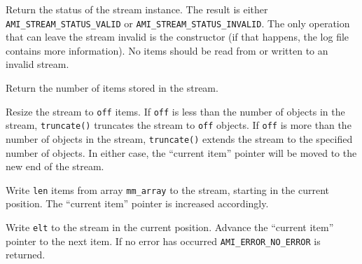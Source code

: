 \etabb


  
 \clearpage

  \btabb
     {Return the status
    of the stream instance. The result is either
    \lstinline|AMI_STREAM_STATUS_VALID| or
    \lstinline|AMI_STREAM_STATUS_INVALID|. The only operation that can
    leave the stream invalid is the constructor (if that happens, the log
    file contains more information). No items should be read from or
    written to an invalid stream.}
  
    {Return the number of items stored in
    the stream.}  
    
      {Resize the stream to
      \lstinline|off| items. If \lstinline|off| is less than the
      number of objects in the stream, \lstinline|truncate()|
      truncates the stream to \lstinline|off| objects. If
      \lstinline|off| is more than the number of objects in the
      stream, \lstinline|truncate()| extends the stream to the
      specified number of objects. In either case, the ``current
      item'' pointer will be moved to the new end of the stream.}
    
      {Write
      \lstinline|len| items from array \lstinline|mm_array| to the
      stream, starting in the current position. The ``current item''
      pointer is increased accordingly.}  
    
      {Write \lstinline|elt| to
      the stream in the current position. Advance the ``current item''
      pointer to the next item. If no error has occurred
      \lstinline|AMI_ERROR_NO_ERROR| is
      returned.} 
  
  \etabb
{}



